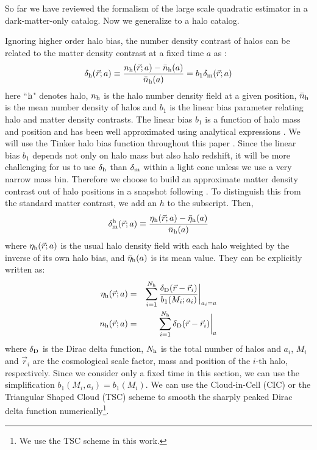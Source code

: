 \documentclass[prd,amsmath,amssymb,floatfix,superscriptaddress,nofootinbib,twocolumn]{revtex4-1}
\def\be{\begin{equation}}
\def\ee{\end{equation}}
\def\bea{\begin{eqnarray}}
\def\eea{\end{eqnarray}}
\newcommand{\vrr}{\vec{r}}
\newcommand{\eql}[1]{\label{eq:#1}}
\newcommand\dmh{\delta_{\rm m}^{\rm h}}
\begin{document}
So far we have reviewed the formalism of the large scale quadratic estimator in a dark-matter-only catalog. Now we generalize to a halo catalog.

Ignoring higher order halo bias, the number density contrast of halos can be related to the matter density contrast at a fixed time $a$ as \cite{Desjacques:2018rev}:
\be 
\delta_{\rm h}(\vrr;a) \equiv \frac{n_{\rm h}(\vrr;a)-\bar{n}_{\rm h}(a)}{\bar{n}_{\rm h}(a)}=b_{1}\delta_{\rm m}(\vrr;a) \eql{hdc}
\ee 
here ``$\rm h$" denotes halo, $n_{\rm h}$ is the halo number density field at a given position, $\bar{n}_{\rm h}$ is the mean number density of halos and $b_{1}$ is the linear bias parameter relating halo and matter density contrasts. The linear bias $b_{1}$ is a function of halo mass and position and has been well approximated using analytical expressions \cite{Seljak:2004SW}\cite{Bhattacharya:2011MF}. We will use the Tinker halo bias function throughout this paper \cite{Tinker:2010Tinker}. Since the linear bias $b_1$ depends not only on halo mass but also halo redshift, it will be more challenging for us to use $\delta_{\rm h}$ than $\delta_{\rm m}$ within a light cone unless we use a very narrow mass bin. Therefore we choose to build an approximate matter density contrast out of halo positions in a snapshot following \cite{Pervical:2007GPS}. To distinguish this from the standard matter contrast, we add an $h$ to the subscript. Then,
\be 
\dmh(\vrr;a) \equiv \frac{\eta_{\rm h}(\vrr;a)-\bar{\eta}_{\rm h}(a)}{\bar{n}_{\rm h}(a)} \eql{hm}
\ee 
where $\eta_{\rm h}(\vrr;a)$ is the usual halo density field with each halo weighted by the inverse of its own halo bias, and $\bar{\eta}_{\rm h}(a)$ is its mean value. They can be explicitly written as:
\bea
\eta_{\rm h}(\vrr;a)&=&\sum_{i=1}^{N_{\rm h}}\frac{\delta_{\rm D}(\vrr-\vrr_{i})}{b_{1}(M_{i};a_{i})}\bigg|_{a_{i}=a} \eql{nob}\\
n_{\rm h}(\vrr;a)&=&\sum_{i=1}^{N_{\rm h}}\delta_{\rm D}(\vrr-\vrr_{i})\bigg|_{a}
\eea
where $\delta_{\rm D}$ is the Dirac delta function, $N_{\rm h}$ is the total number of halos and $a_{i}$, $M_{i}$ and $\vrr_{i}$ are the cosmological scale factor, mass and position of the $i$-th halo, respectively. Since we consider only a fixed time in this section, we can use the simplification $b_{1}(M_{i},a_{i})=b_{1}(M_i)$. We can use the Cloud-in-Cell (CIC) or the Triangular Shaped Cloud (TSC) scheme \cite{Sefusatti:2015CIC} to smooth the sharply peaked Dirac delta function numerically\footnote{We use the TSC scheme in this work.}.
\end{document}
